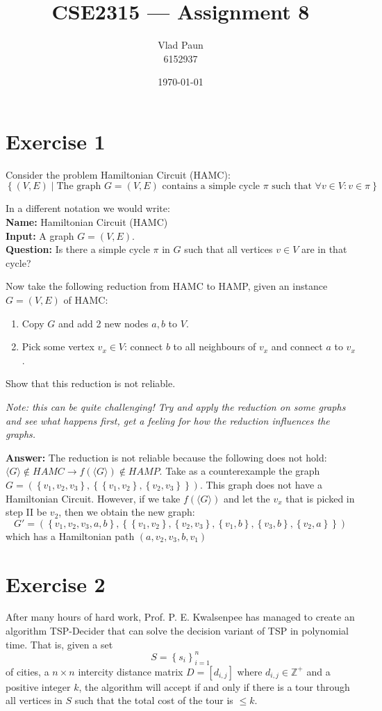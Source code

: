 \documentclass[a4paper,11pt]{article}
\title{\textbf{CSE2315 --- Assignment 8}}
\author{Vlad Paun \\ 6152937}
\date{\today}
\newcommand{\set}[1]{\left\{ #1 \right\}}
\begin{document}
	\maketitle

	\section{Exercise 1}
	Consider the problem Hamiltonian Circuit (HAMC):
	\[
	\set{(V,E) \mid \text{The graph } G=(V,E) \text{ contains a simple cycle } \pi \text{ such that } \forall v \in V : v \in \pi}
	\]

	In a different notation we would write:\\
	\textbf{Name:} Hamiltonian Circuit (HAMC)\\
	\textbf{Input:} A graph $G=(V,E)$.\\
	\textbf{Question:} Is there a simple cycle $\pi$ in $G$ such that all vertices $v \in V$ are in that cycle?

	Now take the following reduction from HAMC to HAMP, given an instance $G=(V,E)$ of HAMC:
	\begin{enumerate}[label=\Roman*.]
		\item Copy $G$ and add 2 new nodes $a,b$ to $V$.
		\item Pick some vertex $v_x \in V$: connect $b$ to all neighbours of $v_x$ and connect $a$ to $v_x$.
	\end{enumerate}

	Show that this reduction is not reliable.

	\textit{Note: this can be quite challenging! Try and apply the reduction on some graphs and see what happens first, get a feeling for how the reduction influences the graphs.}

	\textbf{Answer: }The reduction is not reliable because the following does not hold: $\langle G \rangle\notin HAMC \to f(\langle G\rangle)\notin HAMP$. Take as a counterexample the graph $G=(\set{v_1,v_2,v_3},\set{\set{v_1,v_2},\set{v_2,v_3}})$. This graph does not have a Hamiltonian Circuit. However, if we take $f(\langle G\rangle)$ and let the $v_x$ that is picked in step II be $v_2$, then we obtain the new graph: $$G'=(\set{v_1,v_2,v_3,a,b},\set{\set{v_1,v_2},\set{v_2,v_3},\set{v_1,b},\set{v_3,b},\set{v_2,a}})$$which has a Hamiltonian path $(a,v_2,v_3,b,v_1)$

	\section{Exercise 2}
	After many hours of hard work, Prof. P. E. Kwalsenpee has managed to create an algorithm TSP-Decider that can solve the decision variant of TSP in polynomial time. That is, given a set
	\[
	S=\set{s_i}_{i=1}^n
	\]
	of cities, a $n \times n$ intercity distance matrix $D=[d_{i,j}]$ where $d_{i,j}\in \mathbb{Z}^+$ and a positive integer $k$, the algorithm will accept if and only if there is a tour through all vertices in $S$ such that the total cost of the tour is $\leq k$.
\end{document}
